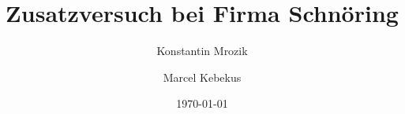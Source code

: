 


\title{Zusatzversuch bei Firma Schnöring}
\author{%
  Konstantin Mrozik\\%
  \and%
  Marcel Kebekus\\%
}
\date[\today] {\today}





\frame{\titlepage}








